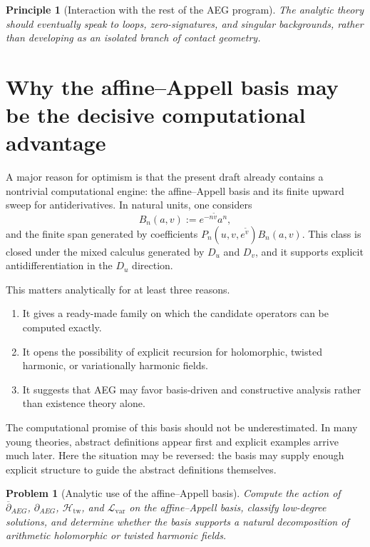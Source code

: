 \documentclass[11pt]{article}
\newtheorem{problem}{Problem}[section]
\newtheorem{principle}{Principle}[section]
\newcommand{\AEG}{AEG}
\newcommand{\delbar}{\overline{\partial}_{\!\AEG}}
\newcommand{\delAEG}{\partial_{\!\AEG}}
\begin{document}
\begin{principle}[Interaction with the rest of the \AEG{} program]
The analytic theory should eventually speak to loops, zero-signatures, and singular backgrounds, rather than developing as an isolated branch of contact geometry.
\end{principle}

\section{Why the affine--Appell basis may be the decisive computational advantage}

A major reason for optimism is that the present draft already contains a nontrivial computational engine: the affine--Appell basis and its finite upward sweep for antiderivatives. In natural units, one considers
\begin{equation}
B_n(a,v) := e^{-n\tilde v} a^n,
\end{equation}
and the finite span generated by coefficients $P_n(u,v,e^{\tilde v})B_n(a,v)$. This class is closed under the mixed calculus generated by $D_u$ and $D_v$, and it supports explicit antidifferentiation in the $D_u$ direction.

This matters analytically for at least three reasons.
\begin{enumerate}[label=(\arabic*)]
\item It gives a ready-made family on which the candidate operators can be computed exactly.
\item It opens the possibility of explicit recursion for holomorphic, twisted harmonic, or variationally harmonic fields.
\item It suggests that \AEG{} may favor basis-driven and constructive analysis rather than existence theory alone.
\end{enumerate}

The computational promise of this basis should not be underestimated. In many young theories, abstract definitions appear first and explicit examples arrive much later. Here the situation may be reversed: the basis may supply enough explicit structure to guide the abstract definitions themselves.

\begin{problem}[Analytic use of the affine--Appell basis]
Compute the action of $\delbar$, $\delAEG$, $\mathcal{H}_{\mathrm{tw}}$, and $\mathcal{L}_{\mathrm{var}}$ on the affine--Appell basis, classify low-degree solutions, and determine whether the basis supports a natural decomposition of arithmetic holomorphic or twisted harmonic fields.
\end{problem}
\end{document}
